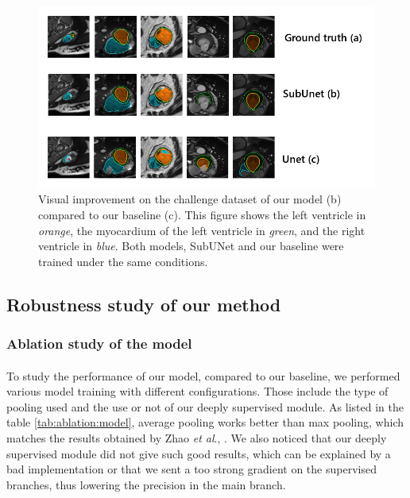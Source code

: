 \documentclass[english]{article}
\newcommand{\etal}{\textit{et al}., }
\begin{document}
\begin{figure}[h]
    \centering
    \includegraphics[scale=1.75]{img/comparaison.png}
    \caption{Visual improvement on the challenge dataset of our model (b) compared to our baseline (c). This figure shows the left ventricle in \textit{orange}, the myocardium of the left ventricle in \textit{green}, and the right ventricle in \textit{blue}. Both models, SubUNet and our baseline were trained under the same conditions.}
    \label{fig:baseline}
\end{figure}




\subsection{Robustness study of our method}
\label{robustness}

\subsubsection{Ablation study of the model}
\paragraph{}
To study the performance of our model, compared to our baseline, we performed various model training with different configurations. Those include the type of pooling used and the use or not of our deeply supervised module. As listed in the table \ref{tab:ablation:model}, average pooling works better than max pooling, which matches the results obtained by Zhao \etal\cite{PSPNet}. We also noticed that our deeply supervised module did not give such good results, which can be explained by a bad implementation or that we sent a too strong gradient on the supervised branches, thus lowering the precision in the main branch.
\end{document}
